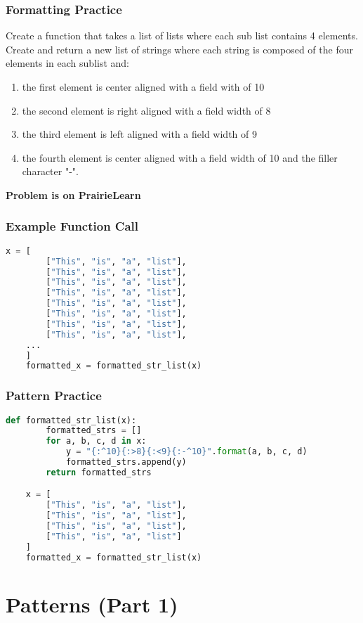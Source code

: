 \documentclass{beamer}
\begin{document}
\begin{frame}[fragile]
  \frametitle{Formatting Practice}
	Create a function that takes a list of lists where each sub list contains 4
	elements. Create and return a new list of strings where each string is composed
	of the four elements in each sublist and:
	\begin{enumerate}
		\item the first element is center aligned with a field with of 10
		\item the second element is right aligned with a field width of 8
		\item the third element is left aligned with a field width of 9
		\item the fourth element is center aligned with a field width of 10 and the filler character "-".
	\end{enumerate}
	\textbf{Problem is on PrairieLearn}
\end{frame}

%
%
\begin{frame}[fragile]
  \frametitle{Example Function Call}
  \begin{lstlisting}[language=Python, autogobble]
	x = [
		["This", "is", "a", "list"],
		["This", "is", "a", "list"],
		["This", "is", "a", "list"],
		["This", "is", "a", "list"],
		["This", "is", "a", "list"],
		["This", "is", "a", "list"],
		["This", "is", "a", "list"],
		["This", "is", "a", "list"],
    ...
	]
	formatted_x = formatted_str_list(x)
  \end{lstlisting}
\end{frame}


%
%
\begin{frame}[fragile]
  \frametitle{Pattern Practice}
  \begin{lstlisting}[language=Python, autogobble]
	def formatted_str_list(x):
		formatted_strs = []
		for a, b, c, d in x:
			y = "{:^10}{:>8}{:<9}{:-^10}".format(a, b, c, d)
			formatted_strs.append(y)
		return formatted_strs

	x = [
		["This", "is", "a", "list"],
		["This", "is", "a", "list"],
		["This", "is", "a", "list"],
		["This", "is", "a", "list"]
	]
	formatted_x = formatted_str_list(x)
  \end{lstlisting}
\end{frame}

\section{Patterns (Part 1)}
\end{document}
